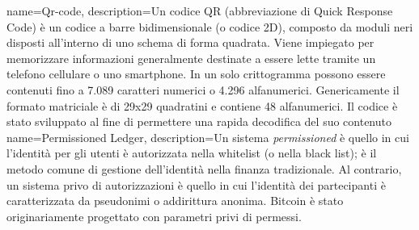 {
	name={Qr-code},
	description={Un codice QR (abbreviazione di Quick Response Code) è un codice a barre bidimensionale (o codice 2D), composto da moduli neri disposti all'interno di uno schema di forma quadrata. Viene impiegato per memorizzare informazioni generalmente destinate a essere lette tramite un telefono cellulare o uno smartphone. In un solo crittogramma possono essere contenuti fino a 7.089 caratteri numerici o 4.296 alfanumerici. Genericamente il formato matriciale è di 29x29 quadratini e contiene 48 alfanumerici. Il codice è stato sviluppato al fine di permettere una rapida decodifica del suo contenuto}
}%
{
	name={Permissioned Ledger},
	description={Un sistema \emph{permissioned} è quello in cui l'identità per gli utenti è autorizzata nella whitelist (o nella black list); è il metodo comune di gestione dell'identità nella finanza tradizionale. Al contrario, un sistema privo di autorizzazioni è quello in cui l'identità dei partecipanti è caratterizzata da pseudonimi o addirittura anonima. Bitcoin è stato originariamente progettato con parametri privi di permessi.}
}%
